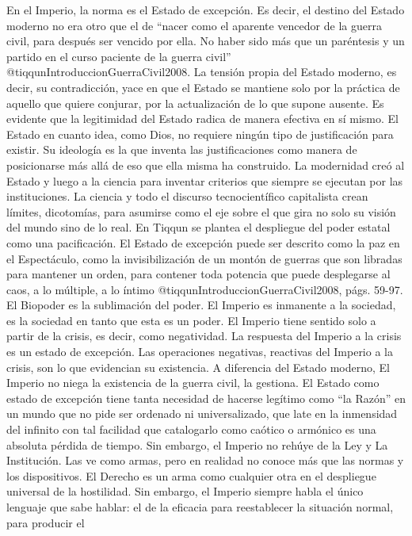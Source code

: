 \documentclass[
]{article}
\begin{document}
En el Imperio, la norma es el Estado de excepción. Es decir, el destino
del Estado moderno no era otro que el de ``nacer como el aparente
vencedor de la guerra civil, para después ser vencido por ella. No haber
sido más que un paréntesis y un partido en el curso paciente de la
guerra civil'' @tiqqunIntroduccionGuerraCivil2008. La tensión propia del
Estado moderno, es decir, su contradicción, yace en que el Estado se
mantiene solo por la práctica de aquello que quiere conjurar, por la
actualización de lo que supone ausente. Es evidente que la legitimidad
del Estado radica de manera efectiva en sí mismo. El Estado en cuanto
idea, como Dios, no requiere ningún tipo de justificación para existir.
Su ideología es la que inventa las justificaciones como manera de
posicionarse más allá de eso que ella misma ha construido. La modernidad
creó al Estado y luego a la ciencia para inventar criterios que siempre
se ejecutan por las instituciones. La ciencia y todo el discurso
tecnocientífico capitalista crean límites, dicotomías, para asumirse
como el eje sobre el que gira no solo su visión del mundo sino de lo
real. En Tiqqun se plantea el despliegue del poder estatal como una
pacificación. El Estado de excepción puede ser descrito como la paz en
el Espectáculo, como la invisibilización de un montón de guerras que son
libradas para mantener un orden, para contener toda potencia que puede
desplegarse al caos, a lo múltiple, a lo íntimo
@tiqqunIntroduccionGuerraCivil2008, págs. 59-97. El Biopoder es la
sublimación del poder. El Imperio es inmanente a la sociedad, es la
sociedad en tanto que esta es un poder. El Imperio tiene sentido solo a
partir de la crisis, es decir, como negatividad. La respuesta del
Imperio a la crisis es un estado de excepción. Las operaciones
negativas, reactivas del Imperio a la crisis, son lo que evidencian su
existencia. A diferencia del Estado moderno, El Imperio no niega la
existencia de la guerra civil, la gestiona. El Estado como estado de
excepción tiene tanta necesidad de hacerse legítimo como ``la Razón'' en
un mundo que no pide ser ordenado ni universalizado, que late en la
inmensidad del infinito con tal facilidad que catalogarlo como caótico o
armónico es una absoluta pérdida de tiempo. Sin embargo, el Imperio no
rehúye de la Ley y La Institución. Las ve como armas, pero en realidad
no conoce más que las normas y los dispositivos. El Derecho es un arma
como cualquier otra en el despliegue universal de la hostilidad. Sin
embargo, el Imperio siempre habla el único lenguaje que sabe hablar: el
de la eficacia para reestablecer la situación normal, para producir el
\end{document}
